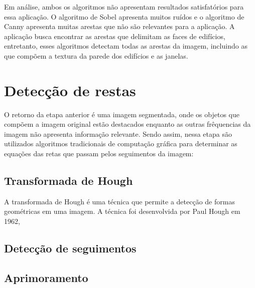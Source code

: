 \documentclass[12pt]{article}
\begin{document}
Em análise, ambos os algoritmos não apresentam resultados satisfatórios para essa aplicação. O algoritmo de Sobel apresenta muitos ruídos e o algoritmo de Canny apresenta muitas arestas que não são relevantes para a aplicação. A aplicação busca encontrar as arestas que delimitam as faces de edifícios, entretanto, esses algoritmos detectam todas as arestas da imagem, incluindo as que compõem a textura da parede dos edifícios e as janelas. 

\section{Detecção de restas}

O retorno da etapa anterior é uma imagem segmentada, onde os objetos que compõem a imagem original estão destacados enquanto as outras frêquencias da imagem não apresenta informação relevante. Sendo assim, nessa etapa são utilizados algoritmos tradicionais de computação gráfica
para determinar as equações das retas que passam pelos seguimentos da imagem:

\subsection{Transformada de Hough}

A transformada de Hough é uma técnica que permite a detecção de formas geométricas em uma imagem. A técnica foi desenvolvida por Paul Hough em 1962, 

\subsection{Detecção de seguimentos}


\subsection{Aprimoramento}
\end{document}
